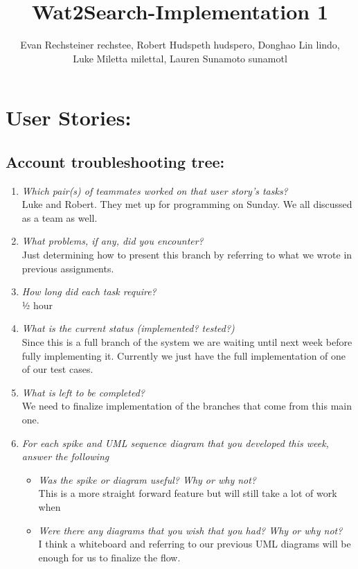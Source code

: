 \documentclass[12pt, letterpaper]{article}
\title{Wat2Search-Implementation 1}
\author{Evan Rechsteiner rechstee, Robert Hudspeth hudspero, Donghao Lin lindo, \\Luke Miletta milettal, Lauren Sunamoto sunamotl 
}
\begin{document}
	\maketitle
	\section{User Stories:}
	   \subsection{Account troubleshooting tree:}
	   \begin{enumerate}
	   	\item \emph{Which pair(s) of teammates worked on that user story's tasks?}
	   	\\Luke and Robert. They met up for programming on Sunday. We all discussed as a team as well.
	   	\item \emph{What problems, if any, did you encounter?}
	   	\\Just determining how to present this branch by referring to what we wrote in previous assignments. 
	   	\item \emph{How long did each task require?}
	   	\\½ hour
	   	\item \emph{What is the current status (implemented? tested?)}
	   	\\Since this is a full branch of the system we are waiting until next week before fully implementing it. Currently we just have the full implementation of one of our test cases.
	   	\item \emph{What is left to be completed?}
	   	\\We need to finalize implementation of the branches that come from this main one. 
	   	\item \emph{For each spike and UML sequence diagram that you developed this week, answer the following}
	   	\begin{itemize}
	   		\item \emph{Was the spike or diagram useful? Why or why not?}
	   		\\This is a more straight forward feature but will still take a lot of work when 
	   		\item \emph{Were there any diagrams that you wish that you had? Why or why not?}
	   		\\I think a whiteboard and referring to our previous UML diagrams will be enough for us to finalize the flow.
	   	\end{itemize}
		\end{enumerate}
	   
\end{document}
